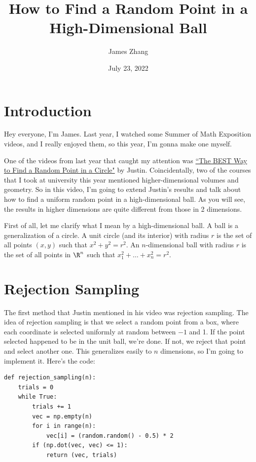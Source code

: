 \documentclass{article}
\title{How to Find a Random Point in a High-Dimensional Ball}
\author{James Zhang}
\date{July 23, 2022}
\begin{document}
\maketitle

\section{Introduction}

Hey everyone, I'm James. Last year, I watched some Summer of Math Exposition videos, and I really enjoyed them, so this year, I'm gonna make one myself.

One of the videos from last year that caught my attention was \href{https://www.youtube.com/watch?v=4y_nmpv-9lI&list=PLnQX-jgAF5pTkwtUuVpqS5tuWmJ-6ZM-Z&index=6&t=3s}{``The BEST Way to Find a Random Point in a Circle"} by Justin. Coincidentally, two of the courses that I took at university this year mentioned higher-dimensional volumes and geometry. So in this video, I'm going to extend Justin's results and talk about how to find a uniform random point in a high-dimensional ball. As you will see, the results in higher dimensions are quite different from those in 2 dimensions.

First of all, let me clarify what I mean by a high-dimensional ball. A ball is a generalization of a circle. A unit circle (and its interior) with radius $r$ is the set of all points $(x, y)$ such that $x^2 + y^2 = r^2$. An $n$-dimensional ball with radius $r$ is the set of all points in $\R^n$ such that $x_1^2 + \ldots + x_n^2 = r^2$.

\section{Rejection Sampling}

The first method that Justin mentioned in his video was rejection sampling. The idea of rejection sampling is that we select a random point from a box, where each coordinate is selected uniformly at random between $-1$ and 1. If the point selected happened to be in the unit ball, we're done. If not, we reject that point and select another one. This generalizes easily to $n$ dimensions, so I'm going to implement it. Here's the code:

\begin{verbatim}
def rejection_sampling(n):
    trials = 0
    while True:
        trials += 1
        vec = np.empty(n)
        for i in range(n):
            vec[i] = (random.random() - 0.5) * 2
        if (np.dot(vec, vec) <= 1):
            return (vec, trials)
\end{verbatim}
\end{document}
